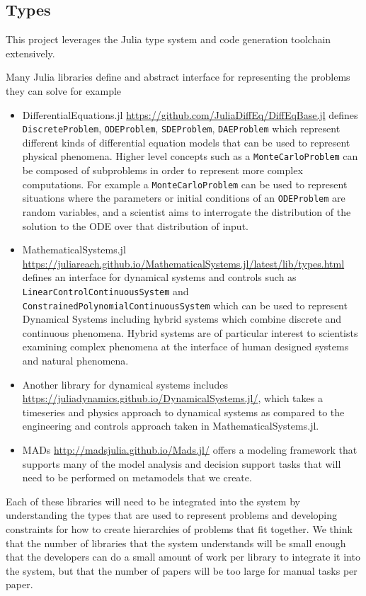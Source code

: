 \documentclass{article}
\begin{document}
\subsection{Types}

This project leverages the Julia type system and code generation toolchain extensively.

Many Julia libraries define and abstract interface for representing the problems they can solve for example \begin{itemize}
    \item DifferentialEquations.jl \url{https://github.com/JuliaDiffEq/DiffEqBase.jl} defines \texttt{DiscreteProblem}, \texttt{ODEProblem}, \texttt{SDEProblem}, \texttt{DAEProblem} which represent different kinds of differential equation models that can be used to represent physical phenomena. Higher level concepts such as a \texttt{MonteCarloProblem} can be composed of subproblems in order to represent more complex computations. For example a \texttt{MonteCarloProblem} can be used to represent situations where the parameters or initial conditions of an \texttt{ODEProblem} are random variables, and a scientist aims to interrogate the distribution of the solution to the ODE over that distribution of input. 
    \item MathematicalSystems.jl \url{https://juliareach.github.io/MathematicalSystems.jl/latest/lib/types.html} defines an interface for dynamical systems and controls such as \texttt{LinearControlContinuousSystem} and \texttt{ConstrainedPolynomialContinuousSystem} which can be used to represent Dynamical Systems including hybrid systems which combine discrete and continuous phenomena. Hybrid systems are of particular interest to scientists examining complex phenomena at the interface of human designed systems and natural phenomena.
    \item Another library for dynamical systems includes \url{https://juliadynamics.github.io/DynamicalSystems.jl/}, which takes a timeseries and physics approach to dynamical systems as compared to the engineering and controls approach taken in MathematicalSystems.jl.
    \item MADs \url{http://madsjulia.github.io/Mads.jl/} offers a modeling framework that supports many of the model analysis and decision support tasks that will need to be performed on metamodels that we create.
\end{itemize}

Each of these libraries will need to be integrated into the system by understanding the types that are used to represent problems and developing constraints for how to create hierarchies of problems that fit together. We think that the number of libraries that the system understands will be small enough that the developers can do a small amount of work per library to integrate it into the system, but that the number of papers will be too large for manual tasks per paper.
\end{document}
